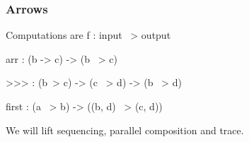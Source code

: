 \documentclass[svgnames,11pt]{beamer}
\begin{document}
\begin{frame}
  
    \begin{center}
    \end{center}


\end{frame}

\begin{frame}
\frametitle{Arrows }

Computations are {{f : input ~> output}}

\begin{center}
\end{center}


\begin{center}
  
{{ arr : (b -> c) -> (b ~> c) }}

{{ >>> : (b~> c) -> (c ~> d) -> (b ~> d) }}

{{ first : (a ~> b) -> ((b, d) ~> (c, d)) }}

\end{center}

\begin{center}
\end{center}

We will lift sequencing, parallel composition and trace. 


\end{frame}
\end{document}
